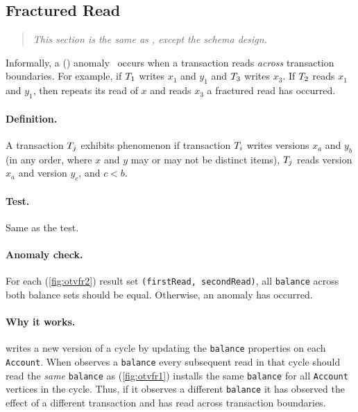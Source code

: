 \subsection{Fractured Read}
\label{sec:fractured-reads}

\begin{quote}
  \textit{This section is the same as \ldbcsnb, except the schema design.}
\end{quote}

Informally, a  ()
anomaly~\cite{DBLP:journals/tods/BailisFGHS16} occurs when a transaction reads
\emph{across} transaction boundaries. For example, if $T_1$ writes $x_1$
and $y_1$ and $T_3$ writes $x_3$. If $T_2$ reads $x_1$ and $y_1$, then
repeats its read of $x$ and reads $x_3$ a fractured read has occurred.

\paragraph{Definition.}
A transaction $T_j$ exhibits phenomenon  if transaction
$T_i$ writes versions $x_a$ and $y_b$ (in any order, where $x$ and $y$ may
or may not be distinct items), $T_j$ reads version $x_a$ and version $y_c$,
and $c < b$.

\paragraph{Test.}
Same as the  test.

\paragraph{Anomaly check.}
For each   (\autoref{fig:otvfr2}) result set
\texttt{(firstRead, secondRead)}, all \texttt{balance} across both balance sets
should be equal. Otherwise, an  anomaly has occurred.

\paragraph{Why it works.}
 writes a new version of a cycle by updating the
\texttt{balance} properties on each \texttt{Account}. When 
observes a \texttt{balance} every subsequent read in that cycle should read the
\emph{same} \texttt{balance} as  (\autoref{fig:otvfr1})
installs the same \texttt{balance} for all \texttt{Account} vertices in the cycle.
Thus, if it observes a different \texttt{balance} it has observed the effect of
a different transaction and has read across transaction boundaries.


